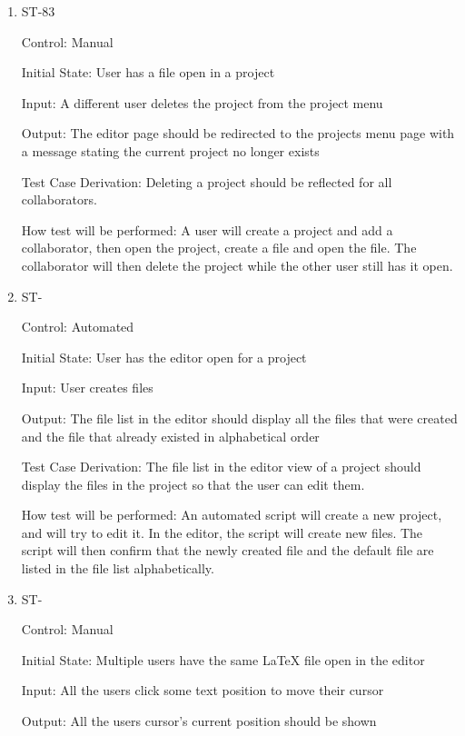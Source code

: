 \documentclass[12pt, titlepage]{article}
\newcounter{TESTID}
\newcommand\TESTNUM{\stepcounter{TESTID}\theTESTID}
\begin{document}
	\begin{enumerate}
		
		\item{ST-83\\}
		
		Control: Manual
		
		Initial State: User has a file open in a project
		
		Input: A different user deletes the project from the project menu
		
		Output: The editor page should be redirected to the projects menu page with a message stating the current project no longer exists
		
		Test Case Derivation: Deleting a project should be reflected for all collaborators.
		
		How test will be performed: A user will create a project and add a collaborator, then open the project, create a file and open the file. The collaborator will then delete the project while the other user still has it open.
		
		\item{ST-\TESTNUM\\}
		
		Control: Automated
		
		Initial State: User has the editor open for a project
		
		Input: User creates files
		
		Output: The file list in the editor should display all the files that were created and the file that already existed in alphabetical order
		
		Test Case Derivation: The file list in the editor view of a project should display the files in the project so that the user can edit them.
		
		How test will be performed: An automated script will create a new project, and will try to edit it. In the editor, the script will create new files. The script will then confirm that the newly created file and the default file are listed in the file list alphabetically.
		
		\item{ST-\TESTNUM\\}
		
		Control: Manual
		
		Initial State: Multiple users have the same LaTeX file open in the editor
		
		Input: All the users click some text position to move their cursor
		
		Output: All the users cursor's current position should be shown
		

\end{enumerate}
\end{document}
